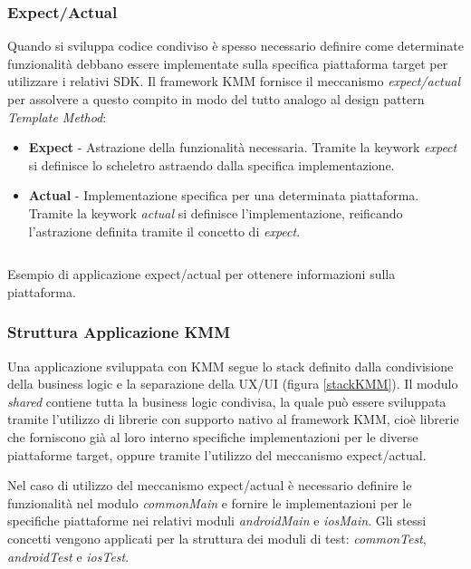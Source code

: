 \subsubsection{Expect/Actual}
Quando si sviluppa codice condiviso è spesso necessario definire come determinate funzionalità debbano essere implementate sulla specifica piattaforma target per utilizzare i relativi SDK. Il framework KMM fornisce il meccanismo \textit{expect/actual} per assolvere a questo compito in modo del tutto analogo al design pattern \textit{Template Method}:
\begin{itemize}
    \item \textbf{Expect} - Astrazione della funzionalità necessaria. Tramite la keywork \textit{expect} si definisce lo scheletro astraendo dalla specifica implementazione.
    \item \textbf{Actual} - Implementazione specifica per una determinata piattaforma. Tramite la keywork \textit{actual} si definisce l'implementazione, reificando l'astrazione definita tramite il concetto di \textit{expect}.
\end{itemize}

\begin{listing}[H]
\inputminted{kotlin}{code/3-expectactual}
\caption{Esempio di applicazione expect/actual per ottenere informazioni sulla piattaforma.}
\end{listing}

\subsubsection{Struttura Applicazione KMM}
Una applicazione sviluppata con KMM segue lo stack definito dalla condivisione della business logic e la separazione della UX/UI (figura \ref{stackKMM}). Il modulo \textit{shared} contiene tutta la business logic condivisa, la quale può essere sviluppata tramite l'utilizzo di librerie con supporto nativo al framework KMM, cioè librerie che forniscono già al loro interno specifiche implementazioni per le diverse piattaforme target, oppure tramite l'utilizzo del meccanismo expect/actual.

Nel caso di utilizzo del meccanismo expect/actual è necessario definire le funzionalità nel modulo \textit{commonMain} e fornire le implementazioni per le specifiche piattaforme nei relativi moduli \textit{androidMain} e \textit{iosMain}. Gli stessi concetti vengono applicati per la struttura dei moduli di test: \textit{commonTest}, \textit{androidTest} e \textit{iosTest}.

